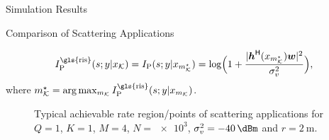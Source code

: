 \documentclass[journal]{IEEEtran}
\begin{document}
\begin{section}{Simulation Results}
\begin{subsection}{Comparison of Scattering Applications}
\begin{itemize}
\begin{equation}
				I_{\text{P}}^{\text{\gls{ris}}}(s;y|x_{\mathcal{K}}) = I_{\text{P}}(s;y|x_{m_{\mathcal{K}}^{\star}}) = \log \Bigl(1 + \frac{\lvert \boldsymbol{h}^\mathsf{H}(x_{m_{\mathcal{K}}^{\star}}) \boldsymbol{w} \rvert^2}{\sigma_v^2}\Bigr),
			\end{equation}
			where $m_{\mathcal{K}}^{\star} = \arg \max_{m_{\mathcal{K}}} I_{\text{P}}^{\text{\gls{ris}}}(s;y|x_{m_{\mathcal{K}}})$.
		\end{itemize}
		\begin{figure}[!t]
			\centering
			\resizebox{0.65\columnwidth}{!}{
				
			}
			\caption{Typical achievable rate region/points of scattering applications for $Q=1$, $K=1$, $M=4$, $N=\num{e3}$, $\sigma_v^2=\SI{-40}{\dBm}$ and $r=\SI{2}{\meter}$.}
			\label{fg:region_comparison}
		\end{figure}


\end{subsection}
\end{section}
\end{document}
